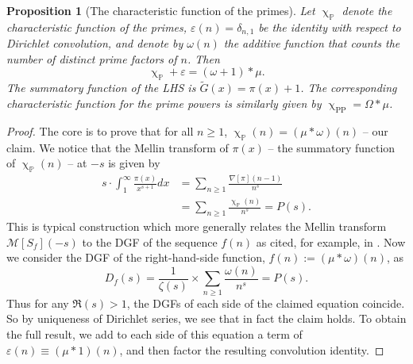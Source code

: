 \documentclass[11pt,reqno,a4letter]{article}
\numberwithin{figure}{section}
\numberwithin{table}{section}
\renewcommand{\chi}{\upchi}
\theoremstyle{plain}
\newtheorem{prop}[theorem]{Proposition}
\numberwithin{theorem}{section}
\theoremstyle{definition}
\begin{document}
\begin{prop}[The characteristic function of the primes] 
\label{prop_AntiqueDivisorSumIdent} 
Let $\chi_{\mathbb{P}}$ denote the characteristic function of the primes, 
$\varepsilon(n) = \delta_{n,1}$ be the identity with respect to Dirichlet convolution, 
and denote by $\omega(n)$ the additive function that counts the number of 
distinct prime factors of $n$. 
Then 
$$\chi_{\mathbb{P}} + \varepsilon = (\omega + 1) \ast \mu.$$ 
The summatory function of the LHS is $\widetilde{G}(x) = \pi(x)+1$. 
The corresponding characteristic function for the prime powers is similarly given by 
$\chi_{\operatorname{PP}} = \Omega \ast \mu$. 
\end{prop}
\begin{proof} 
The core is to prove that for all $n \geq 1$, 
$\chi_{\mathbb{P}}(n) = (\mu \ast \omega)(n)$ -- our claim. 
We notice that the Mellin transform of $\pi(x)$ -- the summatory function of 
$\chi_{\mathbb{P}}(n)$ -- at $-s$ is given by 
\begin{align*} 
s \cdot \int_1^{\infty} \frac{\pi(x)}{x^{s+1}} dx & = \sum_{n \geq 1} \frac{\nabla[\pi](n-1)}{n^s} \\ 
     & = \sum_{n \geq 1} \frac{\chi_{\mathbb{P}}(n)}{n^s} = P(s). 
\end{align*} 
This is typical construction which more generally relates the Mellin transform $\mathcal{M}[S_f](-s)$ to the 
DGF of the sequence $f(n)$ as cited, for example, in \cite[\S 11]{APOSTOLANUMT}. Now we consider the 
DGF of the right-hand-side function, $f(n) := (\mu \ast \omega)(n)$, as 
\[
D_f(s) = \frac{1}{\zeta(s)} \times \sum_{n \geq 1} \frac{\omega(n)}{n^s} = P(s).  
\]
Thus for any $\Re(s) > 1$, the DGFs of each side of the 
claimed equation coincide. So by uniqueness of Dirichlet series, we see that in fact the claim 
holds. To obtain the full result, we add to each side of this equation a term of 
$\varepsilon(n) \equiv (\mu \ast 1)(n)$, and then factor the resulting convolution identity. 
\end{proof} 
\end{document}
